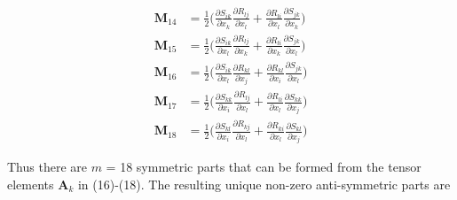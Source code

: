 \begin{subequations}
\begin{align}
	\mathbf{M}_{14}  &= \frac{1}{2} 
			  \bigg( \frac{\partial S_{ik}}{\partial x_k}
					 \frac{\partial R_{lj}}{\partial x_l} 
				  	+ 
					 \frac{\partial R_{li}}{\partial x_l} 
					 \frac{\partial S_{jk}}{\partial x_k} \bigg)  \\
	\mathbf{M}_{15}  &= \frac{1}{2} 
			  \bigg( \frac{\partial S_{ik}}{\partial x_l}
					 \frac{\partial R_{lj}}{\partial x_k} 
				  	+ 
					 \frac{\partial R_{li}}{\partial x_k} 
					 \frac{\partial S_{jk}}{\partial x_l} \bigg)  \\
	\mathbf{M}_{16}  &= \frac{1}{2} 
			  \bigg( \frac{\partial S_{ik}}{\partial x_l}
					 \frac{\partial R_{kl}}{\partial x_j} 
				  	+ 
					 \frac{\partial R_{kl}}{\partial x_i} 
					 \frac{\partial S_{jk}}{\partial x_l} \bigg)  \\
	\mathbf{M}_{17}  &= \frac{1}{2} 
			  \bigg( \frac{\partial S_{kk}}{\partial x_i}
					 \frac{\partial R_{lj}}{\partial x_l} 
				  	+ 
					 \frac{\partial R_{li}}{\partial x_l} 
					 \frac{\partial S_{kk}}{\partial x_j} \bigg)  \\	
	\mathbf{M}_{18}  &= \frac{1}{2} 
			  \bigg( \frac{\partial S_{kl}}{\partial x_i}
					 \frac{\partial R_{kj}}{\partial x_l} 
				  	+ 
					 \frac{\partial R_{ki}}{\partial x_l} 
					 \frac{\partial S_{kl}}{\partial x_j} \bigg)
\end{align}
\end{subequations}
%
%    

Thus there are $m$ = 18 symmetric parts that can be formed from the tensor elements $\mathbf{A}_k$  in (16)-(18). The resulting unique non-zero anti-symmetric parts are 
	  	
